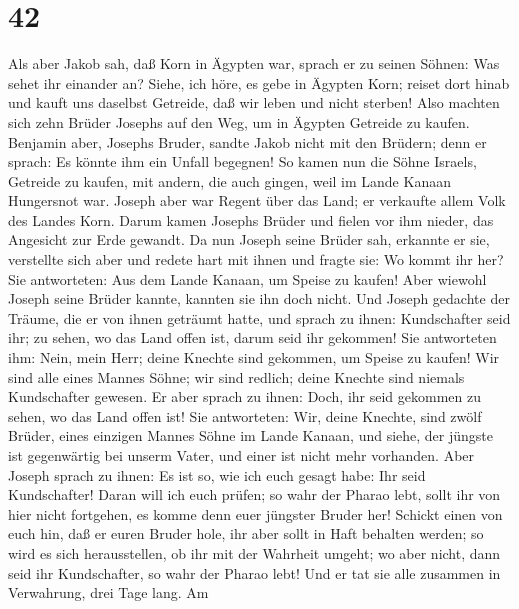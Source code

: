 \hypertarget{section-41}{%
\section{42}\label{section-41}}

 Als aber Jakob sah, daß Korn in Ägypten war, sprach er zu
seinen Söhnen: Was sehet ihr einander an?  Siehe, ich
höre, es gebe in Ägypten Korn; reiset dort hinab und kauft uns daselbst
Getreide, daß wir leben und nicht sterben!  Also machten
sich zehn Brüder Josephs auf den Weg, um in Ägypten Getreide zu kaufen.
 Benjamin aber, Josephs Bruder, sandte Jakob nicht mit den
Brüdern; denn er sprach: Es könnte ihm ein Unfall begegnen!
 So kamen nun die Söhne Israels, Getreide zu kaufen, mit
andern, die auch gingen, weil im Lande Kanaan Hungersnot war.
 Joseph aber war Regent über das Land; er verkaufte allem
Volk des Landes Korn. Darum kamen Josephs Brüder und fielen vor ihm
nieder, das Angesicht zur Erde gewandt.  Da nun Joseph
seine Brüder sah, erkannte er sie, verstellte sich aber und redete hart
mit ihnen und fragte sie: Wo kommt ihr her? Sie antworteten: Aus dem
Lande Kanaan, um Speise zu kaufen!  Aber wiewohl Joseph
seine Brüder kannte, kannten sie ihn doch nicht.  Und
Joseph gedachte der Träume, die er von ihnen geträumt hatte, und sprach
zu ihnen: Kundschafter seid ihr; zu sehen, wo das Land offen ist, darum
seid ihr gekommen!  Sie antworteten ihm: Nein, mein Herr;
deine Knechte sind gekommen, um Speise zu kaufen!  Wir
sind alle eines Mannes Söhne; wir sind redlich; deine Knechte sind
niemals Kundschafter gewesen.  Er aber sprach zu ihnen:
Doch, ihr seid gekommen zu sehen, wo das Land offen ist! 
Sie antworteten: Wir, deine Knechte, sind zwölf Brüder, eines einzigen
Mannes Söhne im Lande Kanaan, und siehe, der jüngste ist gegenwärtig bei
unserm Vater, und einer ist nicht mehr vorhanden.  Aber
Joseph sprach zu ihnen: Es ist so, wie ich euch gesagt habe: Ihr seid
Kundschafter!  Daran will ich euch prüfen; so wahr der
Pharao lebt, sollt ihr von hier nicht fortgehen, es komme denn euer
jüngster Bruder her!  Schickt einen von euch hin, daß er
euren Bruder hole, ihr aber sollt in Haft behalten werden; so wird es
sich herausstellen, ob ihr mit der Wahrheit umgeht; wo aber nicht, dann
seid ihr Kundschafter, so wahr der Pharao lebt!  Und er
tat sie alle zusammen in Verwahrung, drei Tage lang.  Am

